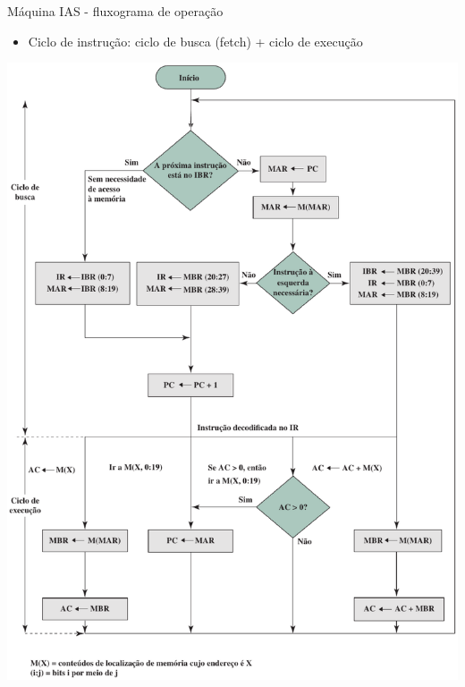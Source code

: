 \begin{slide}[toc=]{Máquina IAS - fluxograma de operação}
	\begin{itemize}
		\item Ciclo de instrução: ciclo de busca (fetch) + ciclo de execução
	\end{itemize}
\begin{center}
   \includegraphics[height=0.70\textheight]{figs/iasfluxopar} 
\end{center}
\end{slide}

